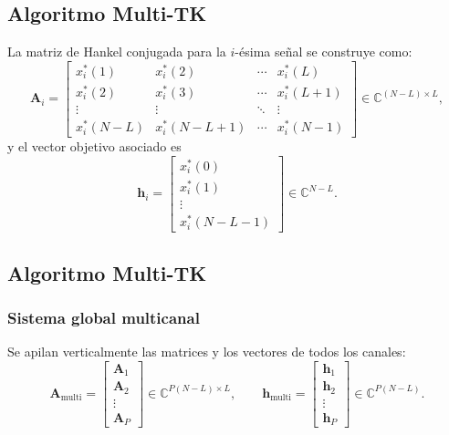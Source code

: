 \subsection{Algoritmo Multi-TK}

La matriz de Hankel conjugada para la $i$-ésima señal se construye como:
\begin{equation}
\mathbf{A}_i =
\begin{bmatrix}
x_i^*(1)   & x_i^*(2)   & \cdots & x_i^*(L) \\
x_i^*(2)   & x_i^*(3)   & \cdots & x_i^*(L+1) \\
\vdots     & \vdots     & \ddots & \vdots   \\
x_i^*(N-L) & x_i^*(N-L+1) & \cdots & x_i^*(N-1)
\end{bmatrix}
\in \mathbb{C}^{(N-L)\times L},
\label{eq:Ai}
\end{equation}
y el vector objetivo asociado es
\begin{equation}
\mathbf{h}_i =
\begin{bmatrix}
x_i^*(0) \\ x_i^*(1) \\ \vdots \\ x_i^*(N-L-1)
\end{bmatrix}
\in \mathbb{C}^{N-L}.
\label{eq:hi}
\end{equation}

\subsection{Algoritmo Multi-TK}
\subsubsection{Sistema global multicanal}

Se apilan verticalmente las matrices y los vectores de todos los canales:
\begin{equation}
\mathbf{A}_{\text{multi}} =
\begin{bmatrix} \mathbf{A}_1 \\ \mathbf{A}_2 \\ \vdots \\ \mathbf{A}_P \end{bmatrix}
\in \mathbb{C}^{P(N-L)\times L},
\qquad
\mathbf{h}_{\text{multi}} =
\begin{bmatrix} \mathbf{h}_1 \\ \mathbf{h}_2 \\ \vdots \\ \mathbf{h}_P \end{bmatrix}
\in \mathbb{C}^{P(N-L)}.
\label{eq:multi_system}
\end{equation}

